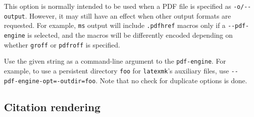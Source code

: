 \documentclass[
]{article}
\begin{document}
\begin{description}
This option is normally intended to be used when a PDF file is specified
as \texttt{-o/-\/-output}. However, it may still have an effect when
other output formats are requested. For example, \texttt{ms} output will
include \texttt{.pdfhref} macros only if a \texttt{-\/-pdf-engine} is
selected, and the macros will be differently encoded depending on
whether \texttt{groff} or \texttt{pdfroff} is specified.
\item[\texttt{-\/-pdf-engine-opt=}\emph{STRING}]
Use the given string as a command-line argument to the
\texttt{pdf-engine}. For example, to use a persistent directory
\texttt{foo} for \texttt{latexmk}'s auxiliary files, use
\texttt{-\/-pdf-engine-opt=-outdir=foo}. Note that no check for
duplicate options is done.
\end{description}

\hypertarget{citation-rendering}{%
\subsection{Citation rendering}\label{citation-rendering}}
\end{document}
